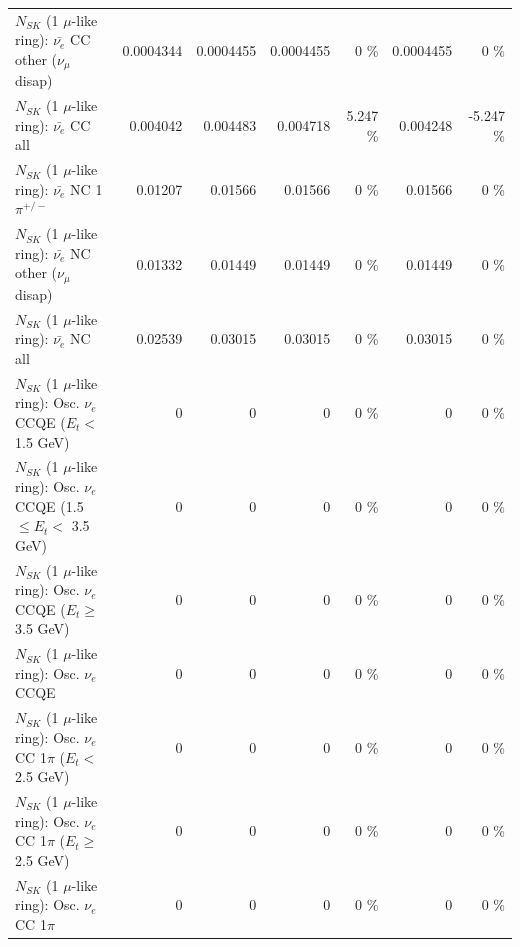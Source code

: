 \begin{table}
\begin{tabular}{| l | r | r | r  r | r  r |}
          $N_{SK}$ (1 $\mu$-like ring): $\bar{\nu_e}$ CC other ($\nu_\mu$ disap) &       0.0004344 &       0.0004455 &       0.0004455 &        0 \%  &       0.0004455 &        0 \%  \\ 
                            $N_{SK}$ (1 $\mu$-like ring): $\bar{\nu_{e}}$ CC all &        0.004042 &        0.004483 &        0.004718 &    5.247 \%  &        0.004248 &   -5.247 \%  \\ 
\hline
                     $N_{SK}$ (1 $\mu$-like ring): $\bar{\nu_e}$ NC 1$\pi^{+/-}$ &         0.01207 &         0.01566 &         0.01566 &        0 \%  &         0.01566 &        0 \%  \\ 
          $N_{SK}$ (1 $\mu$-like ring): $\bar{\nu_e}$ NC other ($\nu_\mu$ disap) &         0.01332 &         0.01449 &         0.01449 &        0 \%  &         0.01449 &        0 \%  \\ 
                            $N_{SK}$ (1 $\mu$-like ring): $\bar{\nu_{e}}$ NC all &         0.02539 &         0.03015 &         0.03015 &        0 \%  &         0.03015 &        0 \%  \\ 
\hline
\hline
\hline
             $N_{SK}$ (1 $\mu$-like ring): Osc. $\nu_e$ CCQE ($E_{t} <$ 1.5 GeV) &               0 &               0 &               0 &        0 \%  &               0 &        0 \%  \\ 
    $N_{SK}$ (1 $\mu$-like ring): Osc. $\nu_e$ CCQE (1.5 $\leq E_{t} <$ 3.5 GeV) &               0 &               0 &               0 &        0 \%  &               0 &        0 \%  \\ 
          $N_{SK}$ (1 $\mu$-like ring): Osc. $\nu_e$ CCQE ($E_{t} \geq$ 3.5 GeV) &               0 &               0 &               0 &        0 \%  &               0 &        0 \%  \\ 
\hline
                                 $N_{SK}$ (1 $\mu$-like ring): Osc. $\nu_e$ CCQE &               0 &               0 &               0 &        0 \%  &               0 &        0 \%  \\ 
\hline
        $N_{SK}$ (1 $\mu$-like ring): Osc. $\nu_e$ CC 1$\pi$ ($E_{t} <$ 2.5 GeV) &               0 &               0 &               0 &        0 \%  &               0 &        0 \%  \\ 
     $N_{SK}$ (1 $\mu$-like ring): Osc. $\nu_e$ CC 1$\pi$ ($E_{t} \geq$ 2.5 GeV) &               0 &               0 &               0 &        0 \%  &               0 &        0 \%  \\ 
\hline
                            $N_{SK}$ (1 $\mu$-like ring): Osc. $\nu_e$ CC 1$\pi$ &               0 &               0 &               0 &        0 \%  &               0 &        0 \%  \\ 

\end{tabular}
\end{table}

